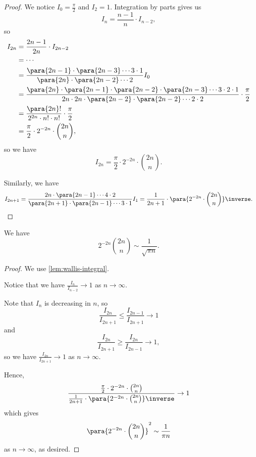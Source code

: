\begin{proof}
    We notice \(I_0 = \frac{\pi}{2}\) and \(I_2 = 1\). Integration by parts gives us
    \[
        I_n = \frac{n - 1}{n} \cdot I_{n - 2},
    \]
    so
    \begin{align*}
        I_{2n} &= \frac{2n - 1}{2n} \cdot I_{2n - 2} \\
        &= \cdots \\
        &= \frac{\para{2n - 1} \cdot \para{2n - 3} \cdots 3 \cdot 1}{\para{2n} \cdot \para{2n - 2} \cdots 2} I_0 \\
        &= \frac{\para{2n} \cdot \para{2n - 1} \cdot \para{2n - 2} \cdot \para{2n - 3} \cdots 3 \cdot 2 \cdot 1}{2n \cdot 2n \cdot \para{2n - 2} \cdot \para{2n - 2} \cdots 2 \cdot 2} \cdot \frac{\pi}{2} \\
        &= \frac{\para{2n}!}{2^{2n} \cdot n! \cdot n!} \cdot \frac{\pi}{2} \\
        &= \frac{\pi}{2} \cdot 2^{-2n} \cdot \binom{2n}{n},
    \end{align*}
    so we have
    \[
        I_{2n} = \frac{\pi}{2} \cdot 2^{-2n} \cdot \binom{2n}{n}.
    \]

    Similarly, we have
    \[
        I_{2n + 1} = \frac{2n \cdot \para{2n - 1} \cdots 4 \cdot 2}{\para{2n + 1} \cdot \para{2n - 1} \cdots 3 \cdot 1} I_1 = \frac{1}{2n + 1} \cdot \para{2^{-2n} \cdot \binom{2n}{n}}\inverse.
    \]

\end{proof}

\begin{corollary}
    \label{cor:asymptotic-binomial-wallis}%
    We have
    \[
        2^{-2n} \binom{2n}{n} \sim \frac{1}{\sqrt{\pi n}}.
    \]
\end{corollary}

\begin{proof}
    We use \autoref{lem:wallis-integral}. 

    Notice that we have \(\frac{I_n}{I_{n - 2}} \to 1\) as \(n \to \infty\).

    Note that \(I_n\) is decreasing in \(n\), so
    \[
        \frac{I_{2n}}{I_{2n + 1}} \leq \frac{I_{2n - 1}}{I_{2n + 1}} \to 1
    \]
    and
    \[
        \frac{I_{2n}}{I_{2n + 1}} \geq \frac{I_{2n}}{I_{2n - 1}} \to 1,
    \]
    so we have \(\frac{I_{2n}}{I_{2n + 1}} \to 1\) as \(n \to \infty\).

    Hence,
    \[
        \frac{\frac{\pi}{2} \cdot 2^{-2n} \cdot \binom{2n}{n}}{\frac{1}{2n + 1} \cdot \para{2^{-2n} \cdot \binom{2n}{n}}\inverse} \to 1
    \]
    which gives
    \[
        \para{2^{-2n} \cdot \binom{2n}{n}}^2 \sim \frac{1}{\pi n}
    \]
    as \(n \to \infty\), as desired.
\end{proof}

